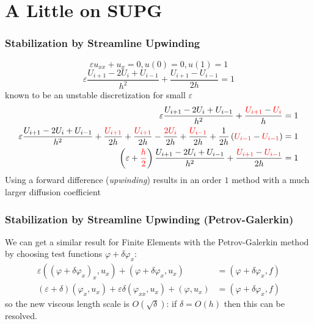 \documentclass[8pt]{beamer}
\begin{document}
\section{A Little on SUPG}
    \begin{frame}
        \frametitle{Stabilization by Streamline Upwinding}
        \begin{equation}
            \varepsilon u_{xx} +
            u_x = 0,
            u(0) = 0, u(1) = 1
        \end{equation}
        \pause
        \begin{equation}
            \varepsilon \dfrac{U_{i + 1} - 2 U_i + U_{i - 1}}{h^2} +
            \dfrac{U_{i + 1} - U_{i - 1}}{2 h} = 1
        \end{equation}
        known to be an unstable discretization for small \(\varepsilon\)
        \pause
        \begin{align}
            \varepsilon
            \dfrac{U_{i + 1} - 2 U_i + U_{i - 1}}{h^2} +
            \dfrac{{\color{red} U_{i + 1}} - {\color{red} U_i}}{h} &= 1       \\
            \varepsilon
            \dfrac{U_{i + 1} - 2 U_i + U_{i - 1}}{h^2} +
            \dfrac{{\color{red} U_{i + 1}}}{2 h} +
            \dfrac{{\color{red} U_{i + 1}}}{2 h} -
            \dfrac{{\color{red} 2 U_i}}{2 h} +
            \dfrac{\color{red} U_{i - 1}}{2 h} +
            \dfrac{1}{2 h}
            \left(
            {{\color{red} U_{i - 1}} - {\color{red} U_{i - 1}}}
            \right)
            &= 1                                                              \\
            \left(\varepsilon + {\color{red} \dfrac{h}{2}}\right)
            \dfrac{U_{i + 1} - 2 U_i + U_{i - 1}}{h^2} +
            \dfrac{{\color{red} U_{i + 1}} - {\color{red} U_{i - 1}}}{2 h} &= 1
        \end{align}
        \pause
        Using a forward difference (\emph{upwinding}) results in an order \(1\)
        method with a much larger diffusion coefficient
    \end{frame}

    \begin{frame}
        \frametitle{Stabilization by Streamline Upwinding (Petrov-Galerkin)}
        We can get a similar result for Finite Elements with the Petrov-Galerkin
        method by choosing test functions \(\varphi + \delta \varphi_x\):
        \begin{align}
            \varepsilon ((\varphi + \delta \varphi_x)_x, u_x)
            + (\varphi + \delta \varphi_x, u_x)
            &= (\varphi + \delta \varphi_x, f)                                \\
            (\varepsilon + \delta) (\varphi_x, u_x)
            + \varepsilon \delta (\varphi_{xx}, u_x)
            + (\varphi, u_x)
            &= (\varphi + \delta \varphi_x, f)
        \end{align}
        so the new viscous length scale is \(O(\sqrt{\delta})\): if \(\delta =
        O(h)\) then this can be resolved.
    \end{frame}
\end{document}
